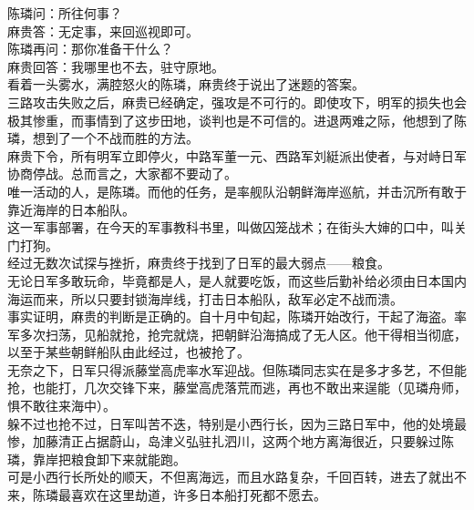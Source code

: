 \begin{multicols}{\theparacolNo}
陈璘问：所往何事？\\

麻贵答：无定事，来回巡视即可。\\

陈璘再问：那你准备干什么？\\

麻贵回答：我哪里也不去，驻守原地。\\

看着一头雾水，满腔怒火的陈璘，麻贵终于说出了迷题的答案。\\

三路攻击失败之后，麻贵已经确定，强攻是不可行的。即使攻下，明军的损失也会极其惨重，而事情到了这步田地，谈判也是不可信的。进退两难之际，他想到了陈璘，想到了一个不战而胜的方法。\\

麻贵下令，所有明军立即停火，中路军董一元、西路军刘綎派出使者，与对峙日军协商停战。总而言之，大家都不要动了。\\

唯一活动的人，是陈璘。而他的任务，是率舰队沿朝鲜海岸巡航，并击沉所有敢于靠近海岸的日本船队。\\

这一军事部署，在今天的军事教科书里，叫做囚笼战术；在街头大婶的口中，叫关门打狗。\\

经过无数次试探与挫折，麻贵终于找到了日军的最大弱点——粮食。\\

无论日军多敢玩命，毕竟都是人，是人就要吃饭，而这些后勤补给必须由日本国内海运而来，所以只要封锁海岸线，打击日本船队，敌军必定不战而溃。\\

事实证明，麻贵的判断是正确的。自十月中旬起，陈璘开始改行，干起了海盗。率军多次扫荡，见船就抢，抢完就烧，把朝鲜沿海搞成了无人区。他干得相当彻底，以至于某些朝鲜船队由此经过，也被抢了。\\

无奈之下，日军只得派藤堂高虎率水军迎战。但陈璘同志实在是多才多艺，不但能抢，也能打，几次交锋下来，藤堂高虎落荒而逃，再也不敢出来逞能（见璘舟师，惧不敢往来海中）。\\

躲不过也抢不过，日军叫苦不迭，特别是小西行长，因为三路日军中，他的处境最惨，加藤清正占据蔚山，岛津义弘驻扎泗川，这两个地方离海很近，只要躲过陈璘，靠岸把粮食卸下来就能跑。\\

可是小西行长所处的顺天，不但离海远，而且水路复杂，千回百转，进去了就出不来，陈璘最喜欢在这里劫道，许多日本船打死都不愿去。\\


\end{multicols}
